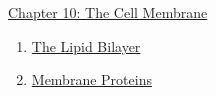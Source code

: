 \documentclass[12pt,letterpaper]{article}
\newcommand{\thetitle}{\hypertarget{home}{Cellular Biology}}
\begin{document}
\clearpage

\renewcommand{\thetitle}{\hypertarget{10}{The Genetic Code of Genes
and Genomes}}
\hypertarget{10}{} 


\begin{chapbox}{\hyperlink{home}{Chapter 10: The Cell Membrane}}
    \begin{enumerate}
        \item \hyperlink{10.1}{The Lipid Bilayer}
        \item \hyperlink{10.2}{Membrane Proteins}
    \end{enumerate}
\end{chapbox}
\end{document}
